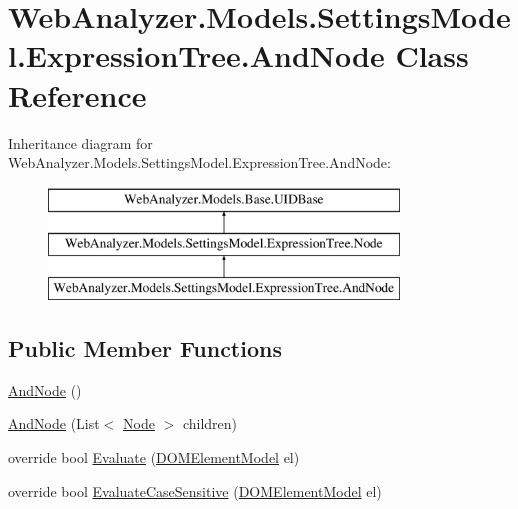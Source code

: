 \hypertarget{class_web_analyzer_1_1_models_1_1_settings_model_1_1_expression_tree_1_1_and_node}{}\section{Web\+Analyzer.\+Models.\+Settings\+Model.\+Expression\+Tree.\+And\+Node Class Reference}
\label{class_web_analyzer_1_1_models_1_1_settings_model_1_1_expression_tree_1_1_and_node}
Inheritance diagram for Web\+Analyzer.\+Models.\+Settings\+Model.\+Expression\+Tree.\+And\+Node\+:\begin{figure}[H]
\begin{center}
\leavevmode
\includegraphics[height=3.000000cm]{class_web_analyzer_1_1_models_1_1_settings_model_1_1_expression_tree_1_1_and_node}
\end{center}
\end{figure}
\subsection*{Public Member Functions}
\begin{DoxyCompactItemize}
\item 
\hyperlink{class_web_analyzer_1_1_models_1_1_settings_model_1_1_expression_tree_1_1_and_node_a615d3ee51170839291bd40488a3c98f6}{And\+Node} ()
\item 
\hyperlink{class_web_analyzer_1_1_models_1_1_settings_model_1_1_expression_tree_1_1_and_node_a377d2c58472a37379647d57188b566d8}{And\+Node} (List$<$ \hyperlink{class_web_analyzer_1_1_models_1_1_settings_model_1_1_expression_tree_1_1_node}{Node} $>$ children)
\item 
override bool \hyperlink{class_web_analyzer_1_1_models_1_1_settings_model_1_1_expression_tree_1_1_and_node_aaa094a884ae4408ec6d6379d3619e7b1}{Evaluate} (\hyperlink{class_web_analyzer_1_1_models_1_1_data_model_1_1_d_o_m_element_model}{D\+O\+M\+Element\+Model} el)
\item 
override bool \hyperlink{class_web_analyzer_1_1_models_1_1_settings_model_1_1_expression_tree_1_1_and_node_a03a2a4ac1c8f85f385682e3e5456fb05}{Evaluate\+Case\+Sensitive} (\hyperlink{class_web_analyzer_1_1_models_1_1_data_model_1_1_d_o_m_element_model}{D\+O\+M\+Element\+Model} el)
\end{DoxyCompactItemize}
